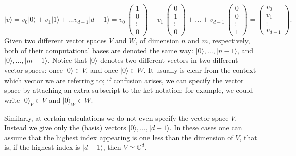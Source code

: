 \documentclass{article}
\theoremstyle{definition}
\newcommand{\ket}[1]{\vert #1 \rangle}
\begin{document}
\begin{equation*}
    \ket{v} = v_0 \ket{0} + v_1 \ket{1} +\dots v_{d-1} \ket{d-1} = v_0 \ \begin{pmatrix} 1 \\ 0 \\ \vdots \\ 0 \end{pmatrix}+ v_1\ 
      \begin{pmatrix} 0 \\ 1 \\ \vdots \\ 0 \end{pmatrix} + \dots + v_{d-1}\ \begin{pmatrix} 0 \\ 0 \\ \vdots \\ 1 \end{pmatrix} =  \begin{pmatrix} v_0 \\ v_1 \\ \vdots \\ v_{d-1} \end{pmatrix}.
\end{equation*}
Given two different vector spaces $V$ and $W$, of dimension $n$ and $m$, respectively, both of their computational bases are denoted the same way: $\ket{0}, \ldots, \ket{n-1}$, and $\ket{0},\ldots, \ket{m-1}$. Notice that $\ket{0}$ denotes two different vectors in two different vector spaces: once $\ket{0}\in V$, and once $\ket{0}\in W$. It usually is clear from the context which vector we are referring to; if confusion arises, we can specify the vector space by attaching an extra subscript to the ket notation; for example, we could write $\ket{0}_V \in V$ and $\ket{0}_W\in W$.

Similarly, at certain calculations we do not even specify the vector space $V$. Instead we give only the (basis) vectors $\ket{0}, \dots , \ket{d-1}$. In these cases one can assume that the highest index appearing is one less than the dimension of $V$, that is, if the highest index is $\ket{d-1}$, then $V\simeq \mathbb{C}^d$.
\end{document}
